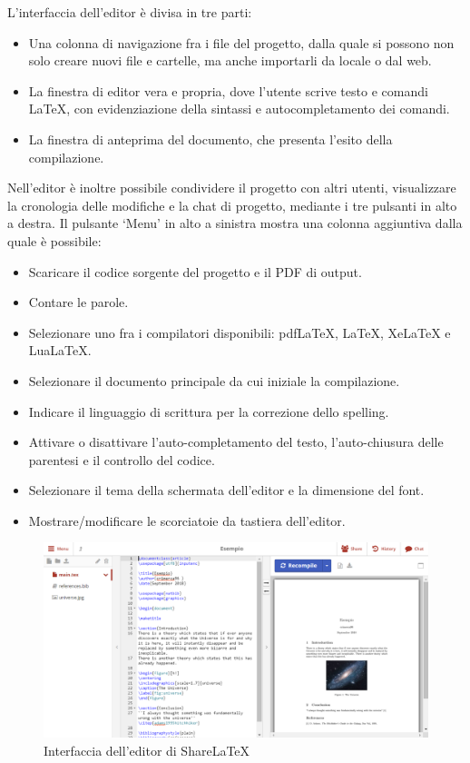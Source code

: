 L'interfaccia dell'editor è divisa in tre parti:
\begin{itemize}
    \item Una colonna di navigazione fra i file del progetto, dalla quale si possono non solo creare nuovi file e cartelle, ma anche importarli da locale o dal web.
    \item La finestra di editor vera e propria, dove l'utente scrive testo e comandi \LaTeX, con evidenziazione della sintassi e autocompletamento dei comandi.
    \item La finestra di anteprima del documento, che presenta l'esito della compilazione.
\end{itemize}
Nell'editor è inoltre possibile condividere il progetto con altri utenti, visualizzare la cronologia delle modifiche e la chat di progetto, mediante i tre pulsanti in alto a destra.
Il pulsante \enquote*{Menu} in alto a sinistra mostra una colonna aggiuntiva dalla quale è possibile:
\begin{itemize}
    \item Scaricare il codice sorgente del progetto e il PDF di output.
    \item Contare le parole.
    \item Selezionare uno fra i compilatori disponibili: pdfLaTeX, \LaTeX, XeLaTeX e LuaLaTeX.
    \item Selezionare il documento principale da cui iniziale la compilazione.
    \item Indicare il linguaggio di scrittura per la correzione dello spelling.
    \item Attivare o disattivare l'auto-completamento del testo, l'auto-chiusura delle parentesi e il controllo del codice.
    \item Selezionare il tema della schermata dell'editor e la dimensione del font.
    \item Mostrare/modificare le scorciatoie da tastiera dell'editor.
\end{itemize}
\begin{figure}[h]
    \centering
    \includegraphics[width=\textwidth]{immagini/editor.PNG}
    \caption{Interfaccia dell'editor di ShareLaTeX}
    \label{fig:sharelatex_editor}
\end{figure}
